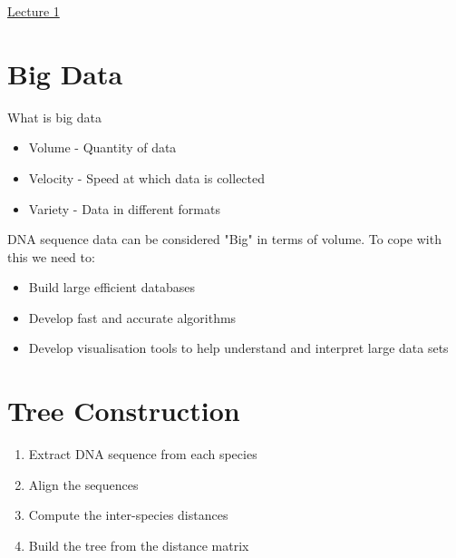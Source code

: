 \documentclass{article}[18pt]
\begin{document}
\begin{center}
\underline{\huge Lecture 1}
\end{center}
\section{Big Data}
What is big data
\begin{itemize}
	\item Volume - Quantity of data
	\item Velocity - Speed at which data is collected
	\item Variety - Data in different formats
\end{itemize}
DNA sequence data can be considered "Big" in terms of volume. To cope with this we need to:
\begin{itemize}
	\item Build large efficient databases
	\item Develop fast and accurate algorithms
	\item Develop visualisation tools to help understand and interpret large data sets
\end{itemize}
\section{Tree Construction}
\begin{enumerate}
	\item Extract DNA sequence from each species
	\item Align the sequences
	\item Compute the inter-species distances
	\item Build the tree from the distance matrix
\end{enumerate}
\end{document}
